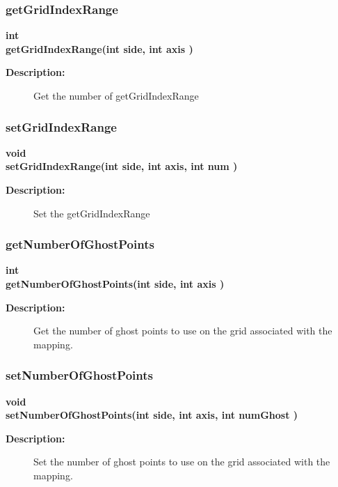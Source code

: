 \subsubsection{getGridIndexRange}
 
\begin{flushleft} \textbf{%
int  \\ 
\settowidth{\MappingIncludeArgIndent}{getGridIndexRange(}%
getGridIndexRange(int side, int axis )
}\end{flushleft}
\begin{description}
\item[{\bf Description:}] 
     Get the number of getGridIndexRange
\end{description}
\subsubsection{setGridIndexRange}
 
\begin{flushleft} \textbf{%
void  \\ 
\settowidth{\MappingIncludeArgIndent}{setGridIndexRange(}%
setGridIndexRange(int side, int axis, int num )
}\end{flushleft}
\begin{description}
\item[{\bf Description:}] 
     Set the getGridIndexRange
\end{description}
\subsubsection{getNumberOfGhostPoints}
 
\begin{flushleft} \textbf{%
int  \\ 
\settowidth{\MappingIncludeArgIndent}{getNumberOfGhostPoints(}%
getNumberOfGhostPoints(int side, int axis )
}\end{flushleft}
\begin{description}
\item[{\bf Description:}] 
     Get the number of ghost points to use on the grid associated with the mapping.
\end{description}
\subsubsection{setNumberOfGhostPoints}
 
\begin{flushleft} \textbf{%
void  \\ 
\settowidth{\MappingIncludeArgIndent}{setNumberOfGhostPoints(}%
setNumberOfGhostPoints(int side, int axis, int numGhost )
}\end{flushleft}
\begin{description}
\item[{\bf Description:}] 
     Set the number of ghost points to use on the grid associated with the mapping.
\end{description}
